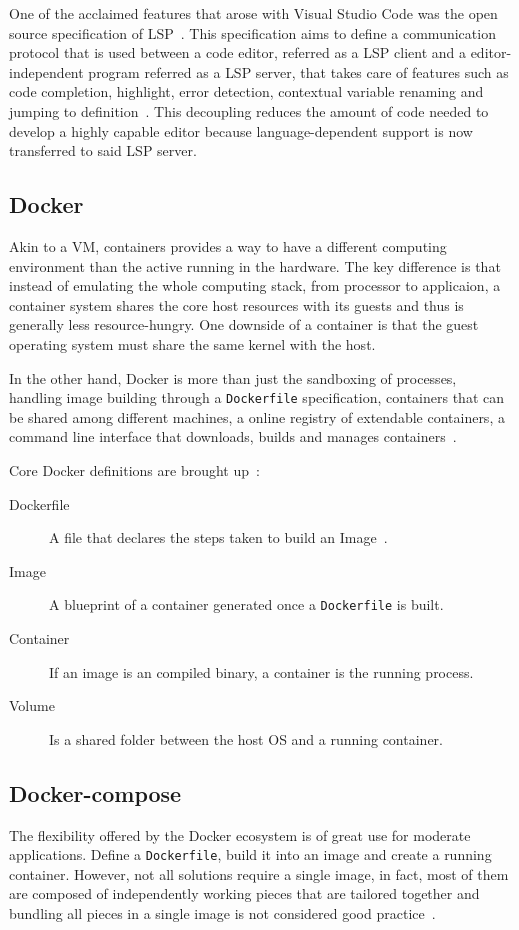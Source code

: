 One of the acclaimed features that arose with Visual Studio Code was the open source specification of \gls{LSP}~\cite{lsplaunch}. This specification aims to define a communication protocol that is used between a code editor, referred as a \gls{LSP} client and a editor-independent program referred as a \gls{LSP} server, that takes care of features such as code completion, highlight, error detection, contextual variable renaming and jumping to definition~\cite{lspspec}. This decoupling reduces the amount of code needed to develop a highly capable editor because language-dependent support is now transferred to said \gls{LSP} server.

\subsection{Docker}
Akin to a \gls{VM}, containers provides a way to have a different computing environment than the active running in the hardware. The key difference is that instead of emulating the whole computing stack, from processor to applicaion, a container system shares the core host resources with its guests and thus is generally less resource-hungry. One downside of a container is that the guest operating system must share the same kernel with the host.

In the other hand, Docker is more than just the sandboxing of processes, handling image building through a \texttt{Dockerfile} specification, containers that can be shared among different machines, a online registry of extendable containers, a command line interface that downloads, builds and manages containers~\cite{dockerfag}.

Core Docker definitions are brought up~\cite{dockeroverview}:
\begin{description}
\item[Dockerfile] A file that declares the steps taken to build an Image~\cite{dockerfile}.
\item[Image] A blueprint of a container generated once a \texttt{Dockerfile} is built.
\item[Container] If an image is an compiled binary, a container is the running process. 
\item[Volume] Is a shared folder between the host \gls{OS} and a running container.
\end{description}

\subsection{Docker-compose}
The flexibility offered by the Docker ecosystem is of great use for moderate applications. Define a \texttt{Dockerfile}, build it into an image and create a running container. However, not all solutions require a single image, in fact, most of them are composed of independently working pieces that are tailored together and bundling all pieces in a single image is not considered good practice~\cite{dockerfag}.

